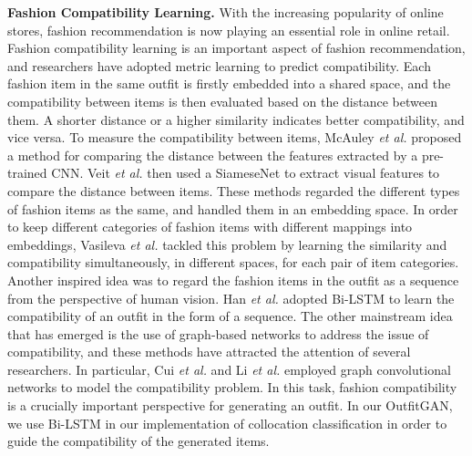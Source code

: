\textbf{Fashion Compatibility Learning.} With the increasing popularity of online stores, fashion recommendation is now playing an essential role in online retail. Fashion compatibility learning is an important aspect of fashion recommendation, and researchers have adopted metric learning to predict compatibility. Each fashion item in the same outfit is firstly embedded into a shared space, and the compatibility between items is then evaluated based on the distance between them. A shorter distance or a higher similarity indicates better compatibility, and vice versa. To measure the compatibility between items, McAuley \textit{et al.} \cite{mcauley2015image} proposed a method for comparing the distance between the features extracted by a pre-trained CNN. Veit \textit{et al.} \cite{veit2015learning} then used a SiameseNet to extract visual features to compare the distance between items. These methods regarded the different types of fashion items as the same, and handled them in an embedding space. In order to keep different categories of fashion items with different mappings into embeddings, Vasileva \textit{et al.} \cite{vasileva2018learning} tackled this problem by learning the similarity and compatibility simultaneously, in different spaces, for each pair of item categories. Another inspired idea was to regard the fashion items in the outfit as a sequence from the perspective of human vision. Han \textit{et al.} \cite{han2017learning} adopted Bi-LSTM to learn the compatibility of an outfit in the form of a sequence. The other mainstream idea that has emerged is the use of graph-based networks to address the issue of compatibility, and these methods have attracted the attention of several researchers. In particular, Cui \textit{et al.} \cite{cui2019dressing} and Li \textit{et al.} \cite{li2020hierarchical} employed graph convolutional networks to model the compatibility problem. In this task, fashion compatibility is a crucially important perspective for generating an outfit. In our OutfitGAN, we use Bi-LSTM in our implementation of collocation classification in order to guide the compatibility of the generated items. 

